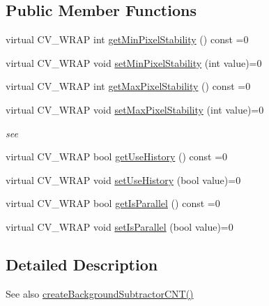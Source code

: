 \subsection*{Public Member Functions}
\begin{DoxyCompactItemize}
\item 
virtual C\+V\+\_\+\+W\+R\+AP int \hyperlink{classcv_1_1bgsubcnt_1_1BackgroundSubtractorCNT_ae989dd01f33c289a21b995ee9c69c600}{get\+Min\+Pixel\+Stability} () const =0
\item 
virtual C\+V\+\_\+\+W\+R\+AP void \hyperlink{classcv_1_1bgsubcnt_1_1BackgroundSubtractorCNT_a7fe9be675d4c1995123a60d56db75422}{set\+Min\+Pixel\+Stability} (int value)=0
\item 
virtual C\+V\+\_\+\+W\+R\+AP int \hyperlink{classcv_1_1bgsubcnt_1_1BackgroundSubtractorCNT_ac45a2faa6b753624cbbff9d341cdd3db}{get\+Max\+Pixel\+Stability} () const =0
\item 
virtual C\+V\+\_\+\+W\+R\+AP void \hyperlink{classcv_1_1bgsubcnt_1_1BackgroundSubtractorCNT_a3414551506bf27dda254dd245bfa8e03}{set\+Max\+Pixel\+Stability} (int value)=0
\begin{DoxyCompactList}\small\item\em see \end{DoxyCompactList}\item 
virtual C\+V\+\_\+\+W\+R\+AP bool \hyperlink{classcv_1_1bgsubcnt_1_1BackgroundSubtractorCNT_a86315a974023e507fdc7a40bba177399}{get\+Use\+History} () const =0
\item 
virtual C\+V\+\_\+\+W\+R\+AP void \hyperlink{classcv_1_1bgsubcnt_1_1BackgroundSubtractorCNT_ab2da57637e04beecbe8d812e00a54c52}{set\+Use\+History} (bool value)=0
\item 
virtual C\+V\+\_\+\+W\+R\+AP bool \hyperlink{classcv_1_1bgsubcnt_1_1BackgroundSubtractorCNT_a2e31e009b3901e4a1e43edf7e87cba51}{get\+Is\+Parallel} () const =0
\item 
virtual C\+V\+\_\+\+W\+R\+AP void \hyperlink{classcv_1_1bgsubcnt_1_1BackgroundSubtractorCNT_ab7d88f5d064b3c5cb0a18e80bd0bc265}{set\+Is\+Parallel} (bool value)=0
\end{DoxyCompactItemize}


\subsection{Detailed Description}
\begin{DoxySeeAlso}{See also}
\hyperlink{namespacecv_1_1bgsubcnt_a6a6efd913954320be33f39c32a4c5a7e}{create\+Background\+Subtractor\+C\+N\+T()} 
\end{DoxySeeAlso}


